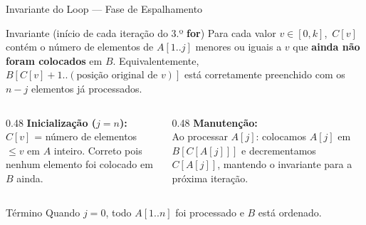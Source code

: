 \documentclass[aspectratio=169]{beamer}
\begin{document}
\begin{frame}[shrink]{Invariante do Loop — Fase de Espalhamento}
  \begin{block}{Invariante (início de cada iteração do 3.º \textbf{for})}
    Para cada valor $v \in [0,k]$,\ $C[v]$ contém o número de elementos de
    $A[1..j]$ menores ou iguais a $v$ que \textbf{ainda não foram colocados} em $B$.
    Equivalentemente, $B[C[v]+1..(\text{posição original de }v)]$ está corretamente
    preenchido com os $n - j$ elementos já processados.
  \end{block}

  \vspace{0.4cm}
  \begin{columns}[T]
    \begin{column}{0.48\textwidth}
      \textbf{Inicialização ($j=n$):}\\
      $C[v]$ = número de elementos $\le v$
      em $A$ inteiro. Correto pois nenhum
      elemento foi colocado em $B$ ainda.
    \end{column}
    \begin{column}{0.48\textwidth}
      \textbf{Manutenção:}\\
      Ao processar $A[j]$: colocamos
      $A[j]$ em $B[C[A[j]]]$ e decrementamos
      $C[A[j]]$, mantendo o invariante para
      a próxima iteração.
    \end{column}
  \end{columns}

  \vspace{0.3cm}
  \begin{exampleblock}{Término}
    Quando $j=0$, todo $A[1..n]$ foi processado e $B$ está ordenado.
  \end{exampleblock}
\end{frame}
\end{document}
